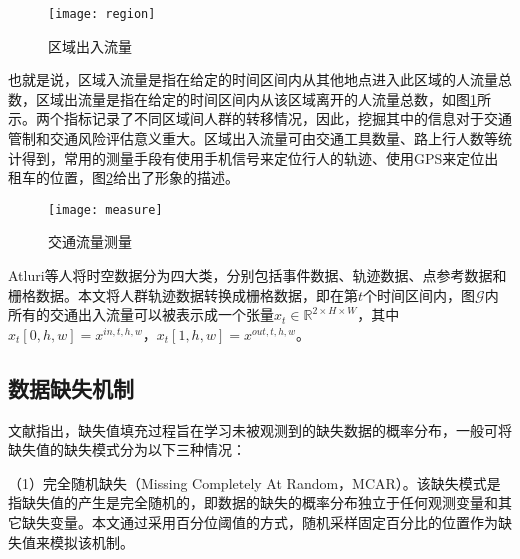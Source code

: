 \begin{figure}[htbp]
\centering
\texttt{[image: region]}
\vspace{0.5em}
\caption{区域出入流量 \label{region}}
\end{figure}
也就是说，区域入流量是指在给定的时间区间内从其他地点进入此区域的人流量总数，区域出流量是指在给定的时间区间内从该区域离开的人流量总数，如图\ref{region}所示。两个指标记录了不同区域间人群的转移情况，因此，挖掘其中的信息对于交通管制和交通风险评估意义重大。区域出入流量可由交通工具数量、路上行人数等统计得到，常用的测量手段有使用手机信号来定位行人的轨迹、使用GPS来定位出租车的位置，图\ref{measure}给出了形象的描述。

\begin{figure}[htbp]
\centering
\texttt{[image: measure]}
\vspace{0.5em}
\caption{交通流量测量 \label{measure}}
\end{figure}


Atluri\cite{atluri2018spatio}等人将时空数据分为四大类，分别包括事件数据、轨迹数据、点参考数据和栅格数据。本文将人群轨迹数据转换成栅格数据，即在第$t$个时间区间内，图$\mathcal{G}$内所有的交通出入流量可以被表示成一个张量$x_t\in\mathbb{R}^{2 \times H \times W}$，其中$x_t[0,h,w]=x^{in,t,h,w}$，$x_t[1,h,w]=x^{out,t,h,w}$。

\subsection{数据缺失机制}
文献指出，缺失值填充过程旨在学习未被观测到的缺失数据的概率分布，一般可将缺失值的缺失模式分为以下三种情况：

（1）完全随机缺失（Missing Completely At Random，MCAR）。该缺失模式是指缺失值的产生是完全随机的，即数据的缺失的概率分布独立于任何观测变量和其它缺失变量。本文通过采用百分位阈值的方式，随机采样固定百分比的位置作为缺失值来模拟该机制。

